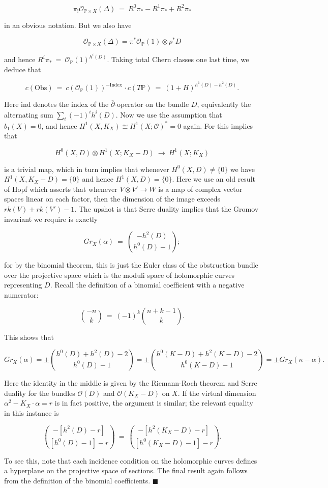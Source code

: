\documentclass[10pt]{article}
\newcommand{\pp}{\mathbb{P}}
\newcommand{\cdbar}{\overline{\partial}}
\newcommand{\ind}{\mathrm{Index \,}}
\newenvironment{Pf}{\par \noindent{\sc Proof:} }{\quad $\blacksquare$ \par
\vspace{0.5cm}}
\begin{document}
\begin{Pf}
$$\pi_! \mathcal{O}_{\pp \times X} (\Delta) \ = \ R^0 \pi_* - R^1
\pi_* + R^2 \pi_*$$

\noindent in an obvious notation.  But we also have 

$$\mathcal{O}_{\pp \times X}(\Delta) = \pi ^*
\mathcal{O}_{\pp} (1)  \otimes p^* D$$

\noindent and hence $R^i \pi_* \ = \ \mathcal{O}_{\pp} (1) ^{h^i
  (D)}$.  Taking total Chern classes one last time, we deduce that

$$c (\mathrm{Obs}) \ = \ c(\mathcal{O}_{\pp} (1)) ^{-\ind}
\cdot c(T\pp) \ = \ (1+H)^{h^1(D) - h^2(D)}.$$

\noindent Here $\mathrm{ind}$ denotes the index of the
$\cdbar$-operator on the bundle $D$, equivalently the alternating
sum $\sum_i (-1)^i h^i (D)$.  Now we use the assumption that $b_1 (X)
= 0$, and hence $H^1 (X, K_X) \cong H^1 (X; \mathcal{O})^* = 0$
again.  For this implies that 

$$H^0 (X, D) \otimes H^1 (X; K_X - D) \ \rightarrow \ H^1 (X; K_X)$$

\noindent is a trivial map, which in turn implies that whenever $H^0
(X, D) \neq \{0\}$ we have $H^1 (X, K_X-D) = \{0\}$ and hence
$H^1(X,D) = \{0\}$.   Here we use an old result of
Hopf which asserts that whenever $V \otimes V' \rightarrow W$ is a map of
complex vector spaces linear on each factor, then the dimension of the
image exceeds $rk(V) + rk (V') - 1$.
The upshot is that Serre duality implies that the Gromov invariant we
require is exactly

$$Gr_X (\alpha) \ = \ {{-h^2 (D)} \choose {h^0(D) - 1}};$$

\noindent for by the binomial theorem, this is just the Euler class of the
obstruction bundle over the projective space which is the moduli space
of holomorphic curves representing $D$.  Recall the definition of a binomial
coefficient with a negative numerator:

$$ {{-n} \choose {k}} \ = \ (-1)^k {{n+k-1} \choose {k}}.$$

\noindent This shows that

$$Gr_X(\alpha)  =  \pm {{h^0(D)+h^2(D)-2} \choose {h^0(D)-1}} = 
\pm{{h^0(K-D)+h^2(K-D)-2} \choose {h^0(K-D)-1}}  =  \pm Gr_X(\kappa-\alpha).$$

\noindent Here the identity in the middle is given by the Riemann-Roch
theorem and Serre duality for the bundles $\mathcal{O}(D)$ and
$\mathcal{O}(K_X-D)$ on $X$.  If the virtual dimension
$\alpha^2-K_X\cdot\alpha = r$ is in fact
positive, the argument is similar; the relevant equality in this
instance is

$${{-[h^2(D)-r]} \choose {[h^0(D)-1]-r}} \ = \ {{-[h^2(K_X-D)-r]}
  \choose {[h^0(K_X-D)-1]-r}}.$$

\noindent To see this, note that each incidence condition on the
holomorphic curves defines a hyperplane on the projective space of
sections.  The final result again follows from the definition of the
binomial coefficients. 
\end{Pf}
\end{document}
